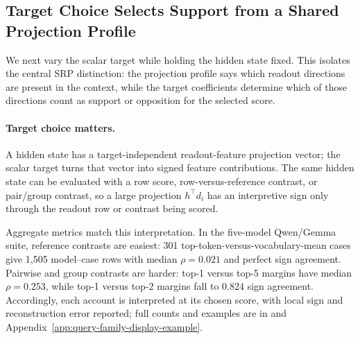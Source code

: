 \subsection{Target Choice Selects Support from a Shared Projection Profile}

We next vary the scalar target while holding the hidden state fixed. This
isolates the central SRP distinction: the projection profile says which readout
directions are present in the context, while the target coefficients determine
which of those directions count as support or opposition for the selected score.

\paragraph{Target choice matters.}
A hidden state has a target-independent readout-feature projection vector; the
scalar target turns that vector into signed feature contributions. The same
hidden state can be evaluated with a row score, row-versus-reference contrast,
or pair/group contrast, so a large projection \(h^\top d_i\) has an
interpretive sign only through the readout row or contrast being scored.

Aggregate metrics match this interpretation. In the five-model Qwen/Gemma suite,
reference contrasts are easiest: 301 top-token-versus-vocabulary-mean cases
give 1,505 model--case rows with median \(\rho=0.021\) and perfect sign
agreement. Pairwise and group contrasts are harder: top-1 versus top-5 margins
have median \(\rho=0.253\), while top-1 versus top-2 margins fall to \(0.824\)
sign agreement. Accordingly, each account is interpreted at its chosen score,
with local sign and reconstruction error reported; full counts and examples are
in  and
Appendix~\ref{app:query-family-display-example}.
